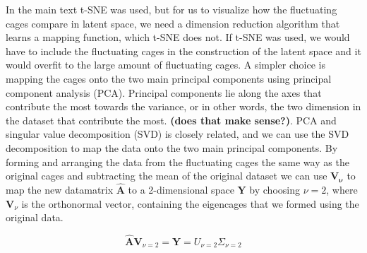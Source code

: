 \documentclass[journal=jacsat,manuscript=article]{achemso}
\begin{document}
{In the main text t-SNE was used, but for us to visualize how the fluctuating cages compare in latent space, we need a dimension reduction algorithm that learns a mapping function, which t-SNE does not. If t-SNE was used, we would have to include the fluctuating cages in the construction of the latent space and it would overfit to the large amount of fluctuating cages. A simpler choice is mapping the cages onto the two main principal components using principal component analysis (PCA). Principal components lie along the axes that contribute the most towards the variance, or in other words, the two dimension in the dataset that contribute the most. \textbf{(does that make sense?)}. PCA and singular value decomposition (SVD) is closely related, and we can use the SVD decomposition to map the data onto the two main principal components. By forming and arranging the data from the fluctuating cages the same way as the original cages and subtracting the mean of the original dataset we can use $\mathbf{V_\nu}$ to map the new datamatrix $\hat{\mathbf{A}}$ to a 2-dimensional space $\mathbf{Y}$ by choosing $\nu = 2$, where $\mathbf{V}_\nu$ is the orthonormal vector, containing the eigencages that we formed using the original data.

\begin{equation}
\hat{\mathbf{A}} \mathbf{V}_{\nu=2} = \mathbf{Y} = U_{\nu=2}\Sigma_{\nu=2}
\label{eq:pca}
\end{equation}

}
\end{document}

